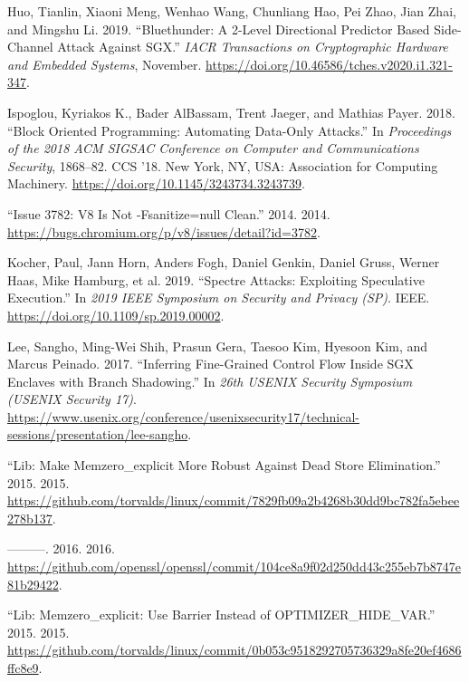 \documentclass[
  a4paper,
]{report}
\newlength{\cslhangindent}
\newlength{\cslentryspacingunit} %
\newenvironment{CSLReferences}[2] %
 {%
  \setlength{\parindent}{0pt}
  \ifodd #1
  \let\oldpar\par
  \def\par{\hangindent=\cslhangindent\oldpar}
  \fi
  \setlength{\parskip}{#2\cslentryspacingunit}
 }%
 {}
\begin{document}
\begin{CSLReferences}{1}{0}
\leavevmode{}%
Huo, Tianlin, Xiaoni Meng, Wenhao Wang, Chunliang Hao, Pei Zhao, Jian
Zhai, and Mingshu Li. 2019. {``Bluethunder: A 2-Level Directional
Predictor Based Side-Channel Attack Against {SGX}.''} \emph{{IACR}
Transactions on Cryptographic Hardware and Embedded Systems}, November.
\url{https://doi.org/10.46586/tches.v2020.i1.321-347}.

\leavevmode{}%
Ispoglou, Kyriakos K., Bader AlBassam, Trent Jaeger, and Mathias Payer.
2018. {``Block Oriented Programming: Automating Data-Only Attacks.''} In
\emph{Proceedings of the 2018 ACM SIGSAC Conference on Computer and
Communications Security}, 1868--82. CCS '18. New York, NY, USA:
Association for Computing Machinery.
\url{https://doi.org/10.1145/3243734.3243739}.

\leavevmode{}%
{``Issue 3782: V8 Is Not -Fsanitize=null Clean.''} 2014. 2014.
\url{https://bugs.chromium.org/p/v8/issues/detail?id=3782}.

\leavevmode{}%
Kocher, Paul, Jann Horn, Anders Fogh, Daniel Genkin, Daniel Gruss,
Werner Haas, Mike Hamburg, et al. 2019. {``Spectre Attacks: Exploiting
Speculative Execution.''} In \emph{2019 {IEEE} Symposium on Security and
Privacy ({SP})}. {IEEE}. \url{https://doi.org/10.1109/sp.2019.00002}.

\leavevmode{}%
Lee, Sangho, Ming-Wei Shih, Prasun Gera, Taesoo Kim, Hyesoon Kim, and
Marcus Peinado. 2017. {``Inferring Fine-Grained Control Flow Inside
{SGX} Enclaves with Branch Shadowing.''} In \emph{26th USENIX Security
Symposium (USENIX Security 17)}.
\url{https://www.usenix.org/conference/usenixsecurity17/technical-sessions/presentation/lee-sangho}.

\leavevmode{}%
{``Lib: Make Memzero\_explicit More Robust Against Dead Store
Elimination.''} 2015. 2015.
\url{https://github.com/torvalds/linux/commit/7829fb09a2b4268b30dd9bc782fa5ebee278b137}.

\leavevmode{}%
---------. 2016. 2016.
\url{https://github.com/openssl/openssl/commit/104ce8a9f02d250dd43c255eb7b8747e81b29422}.

\leavevmode{}%
{``Lib: Memzero\_explicit: Use Barrier Instead of
{OPTIMIZER\_HIDE\_VAR}.''} 2015. 2015.
\url{https://github.com/torvalds/linux/commit/0b053c9518292705736329a8fe20ef4686ffc8e9}.


\end{CSLReferences}
\end{document}
